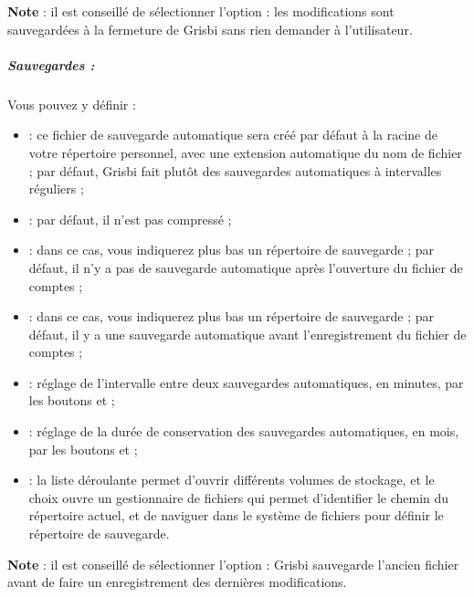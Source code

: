\textbf{Note} : il est conseillé de sélectionner l'option   : les modifications sont sauvegardées à la fermeture de Grisbi sans rien demander à l'utilisateur.


\subparagraph{Sauvegardes :\label{setup-general-files-backup}}

Vous pouvez y définir :

\begin{itemize}
	\item {} : ce fichier de sauvegarde automatique sera créé par défaut à la racine de votre répertoire personnel, avec une extension automatique du nom de fichier ; par défaut, Grisbi fait plutôt des sauvegardes automatiques à intervalles réguliers ;
	\item {} : par défaut, il n'est pas compressé ;
	\item {} : dans ce cas, vous indiquerez plus bas un répertoire de sauvegarde ; par défaut, il n'y a pas de sauvegarde automatique après l'ouverture du fichier de comptes ;
	\item {} : dans ce cas, vous indiquerez plus bas un répertoire de sauvegarde ; par défaut, il y a une sauvegarde automatique avant l'enregistrement du fichier de comptes ;
	\item {} : réglage de l'intervalle entre deux sauvegardes automatiques, en minutes,  par les boutons \menu{+} et \menu{-}  ;
	\item {} : réglage de la durée de conservation des sauvegardes automatiques, en mois,  par les boutons \menu{+} et \menu{-}  ;
	\item {} : la liste déroulante permet d'ouvrir différents volumes de stockage, et le choix  ouvre un gestionnaire de fichiers qui permet d'identifier le chemin du répertoire actuel, et de naviguer dans le système de fichiers pour définir le répertoire de sauvegarde.
\end{itemize}

\textbf{Note} : il est conseillé de sélectionner l'option  : Grisbi sauvegarde l'ancien fichier avant de faire un enregistrement des dernières modifications.

